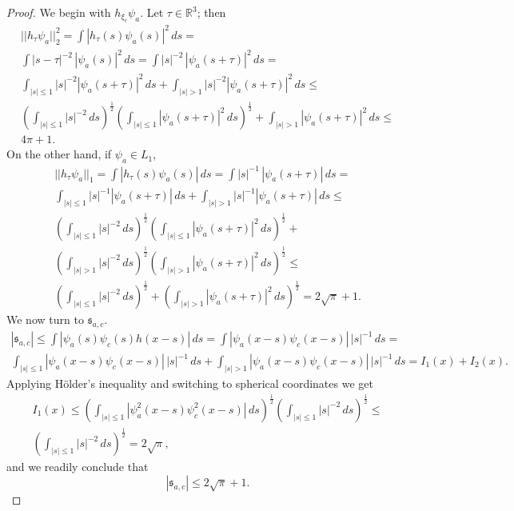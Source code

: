 \documentclass[english, reqno]{amsart}
\newcommand{\half}{\mbox{$\frac{1}{2}$}}
\newcommand{\IR}{\text{${\mathbb{R}}$}}
\newcommand{\s}{\mathfrak{s}}
\begin{document}
\begin{proof}
We begin with $h_{\xi_c} \psi_a$. Let $\tau \in \IR^3$; then
\begin{multline} \label{eq4}
||h_{\tau}\psi_a||^2_2=\int |h_{\tau}(s)\psi_a(s)|^2 \,ds= \\
\int |s-\tau|^{-2}\,|\psi_a(s)|^2 \,ds=\int |s|^{-2}\, |\psi_a(s+\tau)|^2 \,ds =\\
\int _{|s|\le1}|s|^{-2}|\psi_a(s+\tau)|^2 \,ds + \int_{|s| >1} |s|^{-2}|\psi_a(s+\tau)|^2 \,ds\le\\
\left (\int _{|s|\le1}|s|^{-2}\,ds \right)^{\half} \left (\int _{|s|\le1}|\psi_a(s+\tau)|^2 \,ds \right )^{\half} +\int_{|s| >1}|\psi_a(s+\tau)|^2 \,ds \le \\
4\pi+1.
\end{multline}
On the other hand, if $\psi_a \in L_1$,
\begin{multline*}
||h_{\tau}\psi_a||_1= \int |h_{\tau}(s)\psi_a(s)|\,ds= \int |s|^{-1}\, |\psi_a(s+\tau)| \,ds =\\
\int _{|s|\le1}|s|^{-1}|\psi_a(s+\tau)| \,ds+\int _{|s| > 1}|s|^{-1}|\psi_a(s+\tau)| \,ds \le\\
\left ( \int _{|s|\le1}|s|^{-2} \,ds\right )^{\half} \left ( \int _{|s|\le1}|\psi_a(s+\tau)|^2 \,ds \right )^{\half} + \\
\left ( \int _{|s| >1}|s|^{-2} \,ds\right )^{\half} \left ( \int _{|s|>1}|\psi_a(s+\tau)|^2 \,ds \right )^{\half} \le\\
\left ( \int _{|s|\le1}|s|^{-2} \,ds\right )^{\half}+\left ( \int _{|s|>1}|\psi_a(s+\tau)|^2 \,ds \right )^{\half} =
2\sqrt{\pi} +1.
\end{multline*} 
We now turn to $\s_{a,c}$.
\begin{multline*}
|\s_{a,c}| \le
 \int |\psi_a(s) \psi_c(s)h(x-s)|\,ds = \int |\psi_a(x-s) \psi_c(x-s)| \, |s|^{-1}\,ds=\\
 \int_{|s|\le 1}|\psi_a(x-s) \psi_c(x-s)| \,|s|^{-1}\,ds + \int_{|s| > 1}|\psi_a(x-s) \psi_c(x-s)| \,|s|^{-1}\,ds=
 I_1(x)+I_2(x).
\end{multline*} 
Applying H\"older's inequality and switching to spherical coordinates we get
\begin{multline*}
I_1(x) \le \left ( \int_{|s|\le 1}|\psi^2_a(x-s) \psi^2_c(x-s)|\,ds \right )^{\half} \left (\int_{|s|\le1}|s|^{-2}\, ds \right)^{\half} \le \\
\left (\int_{|s|\le1}|s|^{-2}\, ds \right)^{\half} =2\sqrt{\pi},
\end{multline*}
and we readily conclude that
\begin{equation} \label{eq5}
|\s_{a,c}| \le 2\sqrt{\pi}+1.

\end{equation}
\end{proof}
\end{document}

